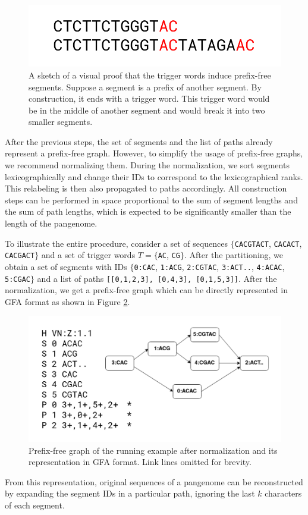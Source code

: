 \begin{figure}
    \centering
    \includegraphics[width=0.6\linewidth]{images/prefixfree_proof.png}
    \caption{
        A sketch of a visual proof that the trigger words induce prefix-free segments.
        Suppose a segment is a prefix of another segment.
        By construction, it ends with a trigger word.
        This trigger word would be in the middle of another segment and would break it into two smaller segments.
    }
    \label{fig:proof}
\end{figure}

After the previous steps, the set of segments and the list of paths already represent a prefix-free graph.
However, to simplify the usage of prefix-free graphs, we recommend normalizing them.
During the normalization, we sort segments lexicographically and change their IDs to correspond to the lexicographical ranks.
This relabeling is then also propagated to paths accordingly.
All construction steps can be performed in space proportional to the sum of segment lengths and the sum of path lengths, which is expected to be significantly smaller than the length of the pangenome.

To illustrate the entire procedure, consider a set of sequences $\{$\texttt{CACGTACT}, \texttt{CACACT}, \texttt{CACGACT}$\}$ and a set of trigger words $T = \{$\texttt{AC}, \texttt{CG}$\}$.
After the partitioning, we obtain a set of segments with IDs $\{$\texttt{0:CAC}, \texttt{1:ACG}, \texttt{2:CGTAC}, \texttt{3:ACT..}, \texttt{4:ACAC}, \texttt{5:CGAC}$\}$ and a list of paths \texttt{[[0,1,2,3], [0,4,3], [0,1,5,3]]}.
After the normalization, we get a prefix-free graph which can be directly represented in GFA format as shown in Figure \ref{fig:gfa}.

\begin{figure}
    \centering
    \includegraphics[width=\linewidth]{images/pfg_gfa.png}
    \caption{
        Prefix-free graph of the running example after normalization and its representation in GFA format.
        Link lines omitted for brevity.
    }
    \label{fig:gfa}
\end{figure}

From this representation, original sequences of a pangenome can be reconstructed by expanding the segment IDs in a particular path, ignoring the last $k$ characters of each segment.

